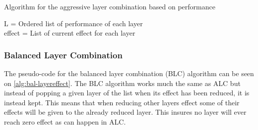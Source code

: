 \begin{algorithm}
    \caption{Algorithm for the aggressive layer combination based on performance}
    \SetAlgoLined
    L = Ordered list of performance of each layer \\
    effect  = List of current effect for each layer \\
    \label{alg:aggresive-layereffect}
\end{algorithm}

\subsubsection{Balanced Layer Combination}
The pseudo-code for the balanced layer combination (BLC) algorithm can be seen on \autoref{alg:bal-layereffect}.
The BLC algorithm works much the same as ALC but instead of popping a given layer of the list when its effect has been reduced, it is instead kept.
This means that when reducing other layers effect some of their effects will be given to the already reduced layer.
This insures no layer will ever reach zero effect as can happen in ALC.

